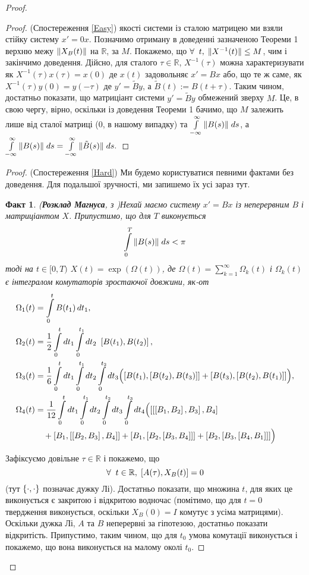 \documentclass[14pt]{extarticle} %
\let\oldforall\forall
\renewcommand{\forall}{\oldforall\;}
\newtheorem*{fact}{Факт}
\theoremstyle{remark}
\begin{document}
\begin{proof}
\begin{proof}{(Спостереження \ref{Easy})}
	якості системи із сталою матрицею ми взяли стійку систему $x'=0x$. Позначимо отриману в доведенні зазначеною Теореми 1 верхню межу
	$\|X_B(t)\|$ на $\mathbb{R}$, за
	$M$. Покажемо, що $\forall t,\;\mynorm{X^{-1}(t)}\leq M$, чим і закінчимо доведення. Дійсно, для сталого $\tau\in\mathbb{R}$,
	$X^{-1}(\tau)$ можна характеризувати як $X^{-1}(\tau)x(\tau)=x(0)$ де $x(t)$ задовольняє $x'=Bx$ або, що те ж саме, як
	$X^{-1}(\tau)y(0)=y(-\tau)$ де $y'=\tilde{B}y$, а $\tilde{B}(t):=B(t+\tau)$. Таким чином, достатньо показати, що матриціант системи
	$y'=\tilde{B}y$ обмежений зверху $M$. Це, в свою чергу, вірно, оскільки із доведення Теореми 1 бачимо, що $M$ залежить лише від
	сталої матриці (0, в нашому випадку) та $\int_{-\infty}^\infty\mynorm{B(s)}\;ds$, а $\int_{-\infty}^\infty\mynorm{B(s)}\;ds=
	\int_{-\infty}^\infty\mynorm{\tilde{B}(s)}\;ds.$
\end{proof}
\begin{proof}{(Спостереження \ref{Hard})}
	Ми будемо користуватися певними фактами без доведення. Для подальшої зручності, ми запишемо їх усі зараз тут.
	\begin{fact}{(\textbf{Розклад Магнуса},
		з \cite{moan})}\label{MagnusConvergenceFact}
		Нехай маємо систему $x'=Bx$ із неперервним $B$ і матриціантом $X$. Припустимо, що для $T$ виконується
		\[\int_0^T\mynorm{B(s)}\;ds<\pi\]
		тоді на $t\in[0,T)$ $X(t)=\exp(\Omega(t))$, де $\Omega(t)=\sum\limits_{k=1}^\infty\Omega_k(t)$ і $\Omega_k(t)$ є інтегралом 
		комутаторів зростаючої довжини, як-от
		\begin{align*}
		\Omega_1(t) &= \int_0^t B(t_1)\,dt_1, \\
		\Omega_2(t) &= \frac{1}{2}\int_0^t dt_1 \int_0^{t_1} dt_2\ \left[  B(t_1),B(t_2)\right], \\
		\Omega_3(t) &= \frac{1}{6} \int_0^t dt_1 \int_0^{t_1}d t_2 \int_0^{t_2} dt_3
		\Bigl(\left[B(t_1),\left[B(t_2),B(t_3)\right]\right]+\left[B(t_3),\left[  B(t_2),B(t_{1})\right]\right]\Bigr), \\
		\Omega_4(t) &= \frac{1}{12} \int_0^t dt_1 \int_0^{t_1}d t_2 \int_0^{t_2} dt_3 \int_0^{t_3} dt_4
		\Bigl(\left[\left[\left[B_1,B_2\right],B_3\right],B_4\right] \\
		&\quad+\left[B_1,\left[\left[B_2,B_3\right],B_4\right]\right]
		+\left[B_1,\left[B_2,\left[B_3,B_4\right]\right]\right]
		+\left[B_2,\left[B_3,\left[B_4,B_1\right]\right]\right]\Bigr)
		\end{align*}
	\end{fact}
	Зафіксуємо довільне $\tau\in\mathbb{R}$ і покажемо, що
	\[\forall t\in\mathbb{R},\;\mysbra{A(\tau),X_B(t)}=0\]
	(тут $\left\{\cdot,\cdot\right\}$ позначає дужку Лі). Достатньо показати, що множина $t$, для яких це виконується є закритою і відкритою
	водночас (помітимо, що для $t=0$ твердження виконується, оскільки $X_B(0)=I$ комутує з усіма матрицями).
	Оскільки дужка Лі, $A$ та $B$ неперервні за гіпотезою, достатньо показати відкритість. Припустимо, таким чином, що для $t_0$ умова 
	комутації виконується і покажемо, що вона виконується на малому околі $t_0$.


\end{proof}
\end{proof}
\end{document}
